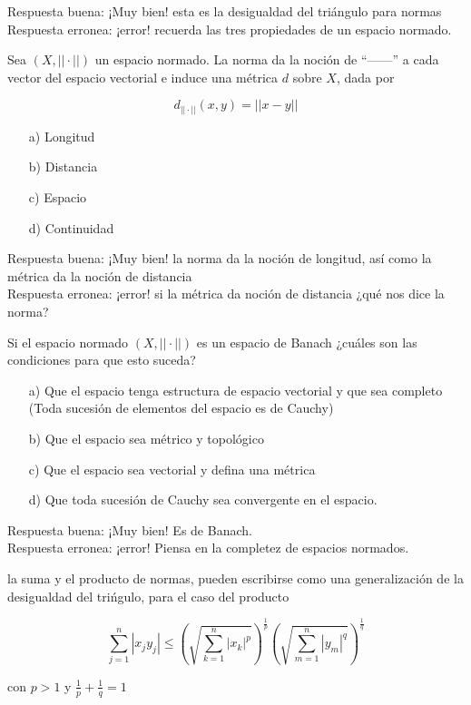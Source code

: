 \documentclass{exam}
\begin{document}
\begin{questions}
Respuesta buena: ¡Muy bien! esta es la desigualdad del triángulo para normas\\
Respuesta erronea: ¡error! recuerda las tres propiedades de un espacio normado.

\question Sea $(X, ||\cdot||)$ un espacio normado. La norma da la noción de ``------'' a cada vector del espacio vectorial e induce una métrica $d$ sobre $X$, dada por

\[d_{||\cdot||}(x,y) = ||x-y|| \]

\begin{itemize}
\item[a)] Longitud
\item[b)] Distancia
\item[c)] Espacio
\item[d)] Continuidad
\end{itemize}

Respuesta buena: ¡Muy bien! la norma da la noción de longitud, así como la métrica da la noción de distancia\\
Respuesta erronea: ¡error! si la métrica da noción de distancia ¿qué nos dice la norma?

\question Si el espacio normado $(X, ||\cdot||)$ es un espacio de Banach ¿cuáles son las condiciones para que esto suceda?

\begin{itemize}
\item[a)] Que el espacio tenga estructura de espacio vectorial y que sea completo (Toda sucesión de elementos del espacio es de Cauchy)
\item[b)] Que el espacio sea métrico y topológico
\item[c)] Que el espacio sea vectorial y defina una métrica
\item[d)] Que toda sucesión de Cauchy sea convergente en el espacio.
\end{itemize}

Respuesta buena: ¡Muy bien! Es de Banach.\\
Respuesta erronea: ¡error! Piensa en la completez de espacios normados.

\question la suma y el producto de normas, pueden escribirse como una generalización de la desigualdad del trińgulo, para el caso del producto

\[\sum_{j=1}^{n} |x_j y_j| \leq  \left(\sqrt{\sum_{k=1}^{n}|x_k|^p}\right)^{\frac{1}{p}} \left(\sqrt{\sum_{m=1}^{n}|y_m|^q}\right) ^{\frac{1}{q}}\]

con $p > 1$ y $\frac{1}{p} + \frac{1}{q} = 1$


\end{questions}
\end{document}
